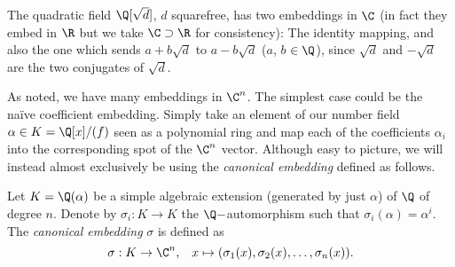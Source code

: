 \begin{example}
    The quadratic field $\Q[\sqrt{d}]$, $d$ squarefree, has two embeddings in $\C$ (in fact they embed in $\R$ but we take $\C \supset \R$ for consistency): The identity mapping, and also the one which sends $a + b\sqrt{d}$ to $a - b\sqrt{d}$ ($a$, $b$ $\in \Q$), since $\sqrt{d}$ and $-\sqrt{d}$ are the two conjugates of $\sqrt{d}$.
\end{example}
 
As noted, we have many embeddings in $\C^n$. The simplest case could be the na\"ive coefficient embedding. Simply take an element of our number field $\alpha \in K = \Q[x]/(f)$ seen as a polynomial ring and map each of the coefficients $\alpha_i$ into the corresponding spot of the $\C^n$ vector. Although easy to picture, we will instead almost exclusively be using the \textit{canonical embedding} defined as follows.

\begin{definition}
	Let $K = \Q(\alpha)$ be a simple algebraic extension (generated by just $\alpha$) of $\Q$ of degree $n$. Denote by $\sigma_i : K \rightarrow K$ the $\Q-$automorphism such that $\sigma_i(\alpha) = \alpha^i$. The \textit{canonical embedding} $\sigma$ is defined as
	\[ \sigma : K \rightarrow \C^n, \; \; \; x \mapsto  (\sigma_1(x), \sigma_2(x), \ldots, \sigma_n(x)). \]
\end{definition}

